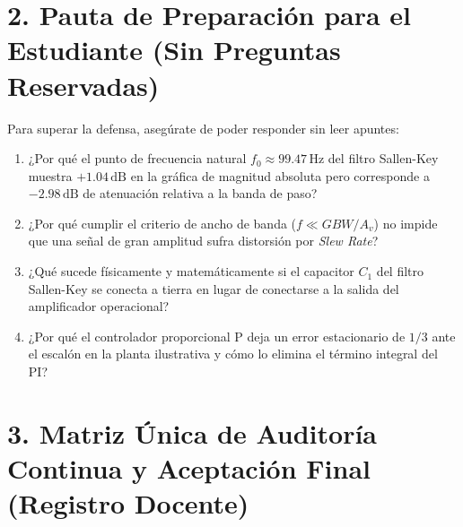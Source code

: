 \documentclass[11pt, a4paper]{article}
\begin{document}
\section*{2. Pauta de Preparación para el Estudiante (Sin Preguntas Reservadas)}
Para superar la defensa, asegúrate de poder responder sin leer apuntes:
\begin{enumerate}[noitemsep]
    \item ¿Por qué el punto de frecuencia natural $f_0 \approx 99.47\,\text{Hz}$ del filtro Sallen-Key muestra $+1.04\,\text{dB}$ en la gráfica de magnitud absoluta pero corresponde a $-2.98\,\text{dB}$ de atenuación relativa a la banda de paso?
    \item ¿Por qué cumplir el criterio de ancho de banda ($f \ll GBW/A_v$) no impide que una señal de gran amplitud sufra distorsión por \textit{Slew Rate}?
    \item ¿Qué sucede físicamente y matemáticamente si el capacitor $C_1$ del filtro Sallen-Key se conecta a tierra en lugar de conectarse a la salida del amplificador operacional?
    \item ¿Por qué el controlador proporcional P deja un error estacionario de $1/3$ ante el escalón en la planta ilustrativa y cómo lo elimina el término integral del PI?
\end{enumerate}

\section*{3. Matriz Única de Auditoría Continua y Aceptación Final (Registro Docente)}
\end{document}
